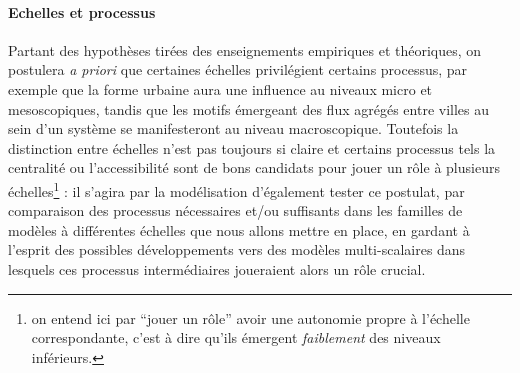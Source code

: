 \paragraph{Echelles et processus}

Partant des hypothèses tirées des enseignements empiriques et théoriques, on postulera \emph{a priori} que certaines échelles privilégient certains processus, par exemple que la forme urbaine aura une influence au niveaux micro et mesoscopiques, tandis que les motifs émergeant des flux agrégés entre villes au sein d'un système se manifesteront au niveau macroscopique. Toutefois la distinction entre échelles n'est pas toujours si claire et certains processus tels la centralité ou l'accessibilité sont de bons candidats pour jouer un rôle à plusieurs échelles\footnote{on entend ici par ``jouer un rôle'' avoir une autonomie propre à l'échelle correspondante, c'est à dire qu'ils émergent \emph{faiblement} %
des niveaux inférieurs.
} : il s'agira par la modélisation d'également tester ce postulat, par comparaison des processus nécessaires et/ou suffisants dans les familles de modèles à différentes échelles que nous allons mettre en place, en gardant à l'esprit des possibles développements vers des modèles multi-scalaires dans lesquels ces processus intermédiaires joueraient alors un rôle crucial. %









